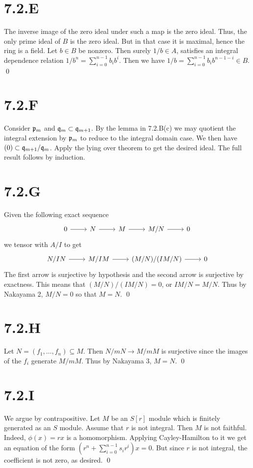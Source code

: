 \documentclass{article}
\begin{document}
\section{7.2.E}
The inverse image of the zero ideal under such a map is the zero ideal. Thus,
the only prime ideal of $B$ is the zero ideal. But in that case it is maximal,
hence the ring is a field. Let $b \in B$ be nonzero. Then surely $1/b \in A$,
satisfies an integral dependence relation $1/b^n=\sum_{i=0}^{n-1} b_ib^i$. Then
we have $1/b=\sum_{i=0}^{n-1} b_ib^{n-1-i} \in B$. \qed

\section{7.2.F}
Consider $\mathfrak{p}_m$ and $\mathfrak{q}_m \subset \mathfrak{q}_{m+1}$. By the lemma in 7.2.B(c) we may
quotient the integral extension by $\mathfrak{p}_m$ to reduce to the integral domain
case. We then have $(0) \subset \mathfrak{q}_{m+1}/\mathfrak{q}_m$. Apply the lying over theorem to
get the desired ideal. The full result follows by induction.

\section{7.2.G}
Given the following exact sequence
\[
    \begin{tikzcd}
        0 \ar[r] & N \ar[r] & M \ar[r] & M/N \ar[r] & 0
    \end{tikzcd}
\]
we tensor with $A/I$ to get
\[
    \begin{tikzcd}
        N/IN \ar[r] & M/IM \ar[r] & (M/N)/(IM/N) \ar[r] & 0
    \end{tikzcd}
\]
The first arrow is surjective by hypothesis and the second arrow is surjective
by exactness. This means that $(M/N)/(IM/N)=0$, or $IM/N=M/N$. Thus by Nakayama
2, $M/N=0$ so that $M=N$. \qed

\section{7.2.H}
Let $N=(f_1, \dots, f_n) \subseteq M$. Then $N/mN \to M/mM$ is surjective since
the images of the $f_i$ generate $M/mM$. Thus by Nakayama 3, $M=N$. \qed

\section{7.2.I}
We argue by contrapositive. Let $M$ be an $S[r]$ module which is finitely
generated as an $S$ module. Assume that $r$ is not integral. Then $M$ is not
faithful. Indeed, $\phi(x)=rx$ is a homomorphism. Applying Cayley-Hamilton to
it we get an equation of the form $(r^n+\sum_{i=0}^{n-1} s_ir^i)x=0$. But since
$r$ is not integral, the coefficient is not zero, as desired. \qed
\end{document}
